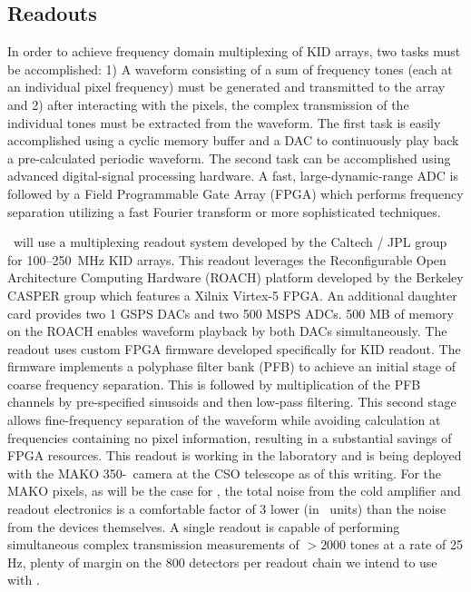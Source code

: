 \subsection{Readouts}
\label{sec:Readouts}

In order to achieve frequency domain multiplexing of KID arrays, two tasks must be accomplished: 1) A waveform consisting of a sum of frequency tones (each at an individual pixel frequency) must be generated and transmitted to the array and 2) after interacting with the pixels, the complex transmission of the individual tones must be extracted from the waveform.  The first task is easily accomplished using a cyclic memory buffer and a DAC to continuously play back a pre-calculated periodic waveform.  The second task can be accomplished using advanced digital-signal processing hardware.  A fast, large-dynamic-range ADC is followed by a Field Programmable Gate Array (FPGA) which performs frequency separation utilizing a fast Fourier transform or more sophisticated techniques.  

\name\ will use a multiplexing readout system developed by the Caltech / JPL group for 100--250~MHz KID arrays.  This readout leverages the Reconfigurable Open Architecture Computing Hardware (ROACH) platform developed by the Berkeley CASPER group which features a Xilnix Virtex-5 FPGA.  An additional daughter card provides two 1 GSPS DACs and two 500 MSPS ADCs.  500 MB of memory on the ROACH enables waveform playback by both DACs simultaneously.  The readout uses custom FPGA firmware developed specifically for KID readout.  The firmware implements a polyphase filter bank (PFB) to achieve an initial stage of coarse frequency separation.  This is followed by multiplication of the PFB channels by pre-specified sinusoids and then low-pass filtering.  This second stage allows fine-frequency separation of the waveform while avoiding calculation at frequencies containing no pixel information, resulting in a substantial savings of FPGA resources.  This readout is working in the laboratory and is being deployed with 
the MAKO 350-\mum\ camera at the CSO telescope as of this writing.  For the MAKO pixels, as will be the case for \name, the total noise from the cold amplifier and readout electronics is a comfortable factor of 3 lower (in \Sxx\ units) than the noise from the devices themselves.   A single readout is capable of performing simultaneous complex transmission measurements of $>2000$ tones at a rate of 25 Hz, plenty of margin on the 800 detectors per readout chain we intend to use with \name.


